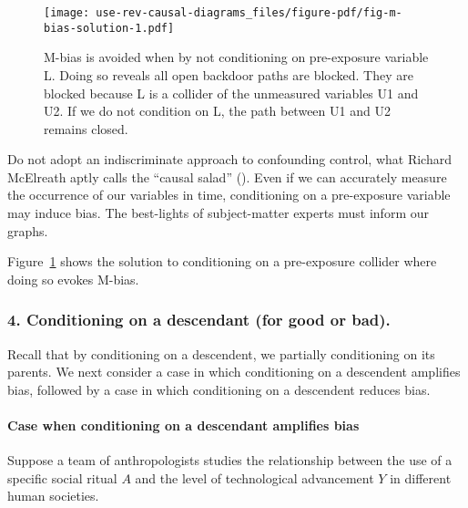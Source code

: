 \documentclass[
  singlecolumn,
  9pt]{article}
\let\oldparagraph\paragraph
\renewcommand{\paragraph}[1]{\oldparagraph{#1}\mbox{}}
\begin{document}
\begin{figure}

{\centering \texttt{[image: use-rev-causal-diagrams\_files/figure-pdf/fig-m-bias-solution-1.pdf]}

}

\caption{\label{fig-m-bias-solution}M-bias is avoided when by not
conditioning on pre-exposure variable L. Doing so reveals all open
backdoor paths are blocked. They are blocked because L is a collider of
the unmeasured variables U1 and U2. If we do not condition on L, the
path between U1 and U2 remains closed.}

\end{figure}

Do not adopt an indiscriminate approach to confounding control, what
Richard McElreath aptly calls the ``causal salad''
(). Even if we can
accurately measure the occurrence of our variables in time, conditioning
on a pre-exposure variable may induce bias. The best-lights of
subject-matter experts must inform our graphs.

Figure~\ref{fig-m-bias-solution} shows the solution to conditioning on a
pre-exposure collider where doing so evokes M-bias.

\subsubsection{4. Conditioning on a descendant (for good or
bad).}\label{conditioning-on-a-descendant-for-good-or-bad.}

Recall that by conditioning on a descendent, we partially conditioning
on its parents. We next consider a case in which conditioning on a
descendent amplifies bias, followed by a case in which conditioning on a
descendent reduces bias.

\paragraph{Case when conditioning on a descendant amplifies
bias}\label{case-when-conditioning-on-a-descendant-amplifies-bias}

Suppose a team of anthropologists studies the relationship between the
use of a specific social ritual \(A\) and the level of technological
advancement \(Y\) in different human societies.
\end{document}
